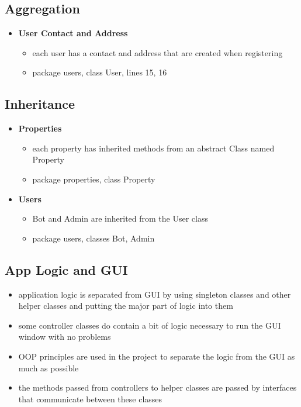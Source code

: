 \documentclass[
]{report}
\providecommand{\tightlist}{%
  \setlength{\itemsep}{0pt}\setlength{\parskip}{0pt}}
\begin{document}
\hypertarget{aggregation}{%
\subsection{Aggregation}\label{aggregation}}

\begin{itemize}
\tightlist
\item
  \textbf{User Contact and Address}

  \begin{itemize}
  \tightlist
  \item
    each user has a contact and address that are created when registering
  \item
    package users, class User, lines 15, 16
  \end{itemize}
\end{itemize}

\hypertarget{inheritance}{%
\subsection{Inheritance}\label{inheritance}}

\begin{itemize}
\tightlist
\item
  \textbf{Properties}

  \begin{itemize}
  \tightlist
  \item
    each property has inherited methods from an abstract Class named Property
  \item
    package properties, class Property
  \end{itemize}
\item
  \textbf{Users}

  \begin{itemize}
  \tightlist
  \item
    Bot and Admin are inherited from the User class
  \item
    package users, classes Bot, Admin
  \end{itemize}
\end{itemize}

\hypertarget{app-logic-and-gui}{%
\subsection{App Logic and GUI}\label{app-logic-and-gui}}

\begin{itemize}
\tightlist
\item
  application logic is separated from GUI by using singleton classes and other helper classes and putting the major part of logic into them
\item
  some controller classes do contain a bit of logic necessary to run the GUI window with no problems
\item
  OOP principles are used in the project to separate the logic from the GUI as much as possible
\item
  the methods passed from controllers to helper classes are passed by interfaces that communicate between these classes
\end{itemize}
\end{document}
